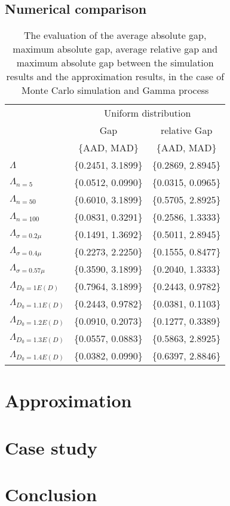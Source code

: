 \documentclass[preprint,12pt]{elsarticle}
\begin{document}
\subsection{Numerical comparison}
\begin{table} [h]
\begin{tabular}{|l|c c|}
\hline
&\multicolumn{2}{|c|}{Uniform distribution}\\
&Gap&relative Gap\\
&\{AAD, MAD\}&\{AAD, MAD\} \\
\hline
$\Lambda$&\{0.2451, 3.1899\}&\{0.2869, 2.8945\}\\
$\Lambda_{n=5}$&\{0.0512, 0.0990\}&\{0.0315, 0.0965\}\\
$\Lambda_{n=50}$&\{0.6010, 3.1899\}&\{0.5705, 2.8925\}\\
$\Lambda_{n=100}$&\{0.0831, 0.3291\}&\{0.2586, 1.3333\}\\
$\Lambda_{\sigma=0.2\mu}$&\{0.1491, 1.3692\}&\{0.5011, 2.8945\}\\
$\Lambda_{\sigma=0.4\mu}$&\{0.2273, 2.2250\}&\{0.1555, 0.8477\}\\
$\Lambda_{\sigma=0.57\mu}$&\{0.3590, 3.1899\}&\{0.2040, 1.3333\}\\
$\Lambda_{D_{0}=1E(D)}$&\{0.7964, 3.1899\}&\{0.2443, 0.9782\}\\
$\Lambda_{D_{0}=1.1E(D)}$&\{0.2443, 0.9782\}&\{0.0381, 0.1103\}\\
$\Lambda_{D_{0}=1.2E(D)}$&\{0.0910, 0.2073\}&\{0.1277, 0.3389\}\\
$\Lambda_{D_{0}=1.3E(D)}$&\{0.0557, 0.0883\}&\{0.5863, 2.8925\}\\
$\Lambda_{D_{0}=1.4E(D)}$&\{0.0382, 0.0990\}&\{0.6397, 2.8846\}\\
\hline
\end{tabular}
\caption{The evaluation of the average absolute gap, maximum absolute gap, average relative gap and maximum absolute gap between the simulation results and the approximation results, in the case of Monte Carlo simulation and Gamma process}
\end{table}
\section{Approximation}
\section{Case study}
\section{Conclusion}
\end{document}
